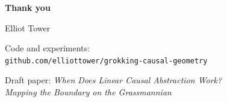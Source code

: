 \documentclass[aspectratio=169,11pt]{beamer}
\begin{document}
\begin{frame}[plain]
\vfill
\begin{center}
{\Large\bfseries Thank you}

\vspace{1em}
{\small Elliot Tower}

\vspace{1em}
{\small Code and experiments:\\
\texttt{github.com/elliottower/grokking-causal-geometry}}

\vspace{1em}
{\small Draft paper: \emph{When Does Linear Causal Abstraction Work?\\Mapping the Boundary on the Grassmannian}}
\end{center}
\vfill
\end{frame}
\end{document}
